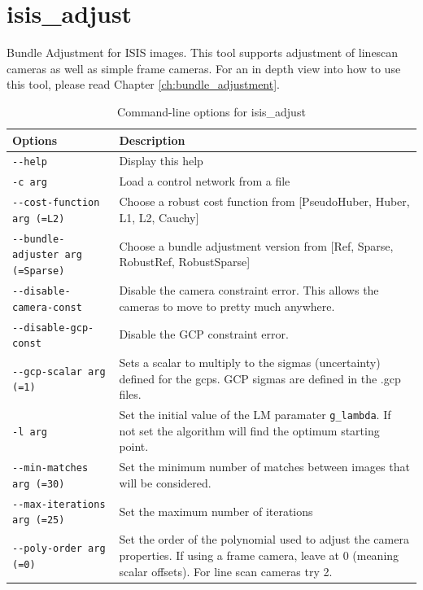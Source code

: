
\section{isis\_adjust}

Bundle Adjustment for ISIS images. This tool supports adjustment of
linescan cameras as well as simple frame cameras. For an in depth view
into how to use this tool, please read Chapter
\ref{ch:bundle_adjustment}.

\begin{longtable}{|l|p{10cm}|}
\caption{Command-line options for isis\_adjust}
\label{tbl:isise_adjust}
\endfirsthead
\endhead
\endfoot
\endlastfoot
\hline
Options & Description \\ \hline \hline
\verb#--help# & Display this help \\ \hline
\verb#-c arg# & Load a control network from a file \\ \hline
\verb#--cost-function arg (=L2)# & Choose a robust cost function from [PseudoHuber, Huber, L1, L2, Cauchy] \\ \hline
\verb#--bundle-adjuster arg (=Sparse)# & Choose a bundle adjustment version from [Ref, Sparse, RobustRef, RobustSparse] \\ \hline
\verb#--disable-camera-const# & Disable the camera constraint error. This allows the cameras to move to pretty much anywhere. \\ \hline
\verb#--disable-gcp-const# & Disable the GCP constraint error. \\ \hline
\verb#--gcp-scalar arg (=1)# & Sets a scalar to multiply to the sigmas (uncertainty) defined for the gcps. GCP sigmas are defined in the .gcp files. \\ \hline
\verb#-l arg# & Set the initial value of the LM paramater \texttt{g\_lambda}. If not set the algorithm will find the optimum starting point. \\ \hline
\verb#--min-matches arg (=30)# & Set the minimum number of matches between images that will be considered. \\ \hline
\verb#--max-iterations arg (=25)# & Set the maximum number of iterations \\ \hline
\verb#--poly-order arg (=0)# & Set the order of the polynomial used to adjust the camera properties. If using a frame camera, leave at 0 (meaning scalar offsets). For line scan cameras try 2. \\ \hline

\end{longtable}
